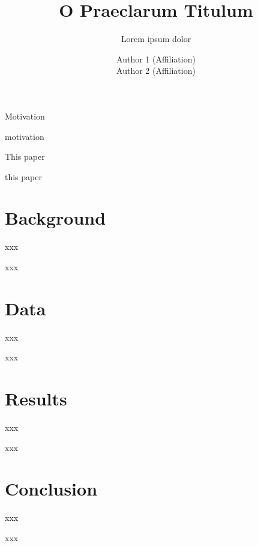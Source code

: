 \documentclass[10pt,t,aspectratio=169]{beamer}
\title{O Praeclarum Titulum}
\subtitle{Lorem ipsum dolor}
\date{}
\author{Author 1 (Affiliation) \\
        Author 2 (Affiliation)}
\begin{document}
\maketitle

\begin{frame}{Motivation}

    motivation

\end{frame}

\begin{frame}{This paper}

    this paper
  
\end{frame}

\section{Background}

\begin{frame}{xxx}

    xxx
  
\end{frame}

\section{Data}

\begin{frame}{xxx}

    xxx
  
\end{frame}

\section{Results}

\begin{frame}{xxx}

    xxx
  
\end{frame}

\section{Conclusion}

\begin{frame}{xxx}

    xxx
  
\end{frame}
\end{document}
